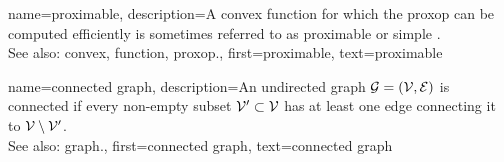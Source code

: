 {name={proximable},
	description={A 
		\gls{convex} \gls{function} for which the \gls{proxop} can be computed efficiently is 
		sometimes referred to as proximable or simple \cite{Condat2013}.
					\\ 
		See also: \gls{convex}, \gls{function}, \gls{proxop}.},
	first={proximable},
	text={proximable}
}


{name={connected graph}, 
	description={An 
		undirected \gls{graph} $\mathcal{G}=\left( \mathcal{V},\mathcal{E} \right)$ is connected if every 
		non-empty subset $\mathcal{V}' \subset \mathcal{V}$ has at least one edge connecting it to $\mathcal{V} \setminus \mathcal{V}'$.
					\\ 
		See also: \gls{graph}.}, 
	first={connected graph},
	text={connected graph}
}
	
